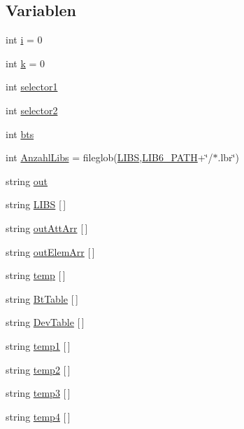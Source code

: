 \subsection*{Variablen}
\begin{DoxyCompactItemize}
\item 
int \hyperlink{test_8ulp_acb559820d9ca11295b4500f179ef6392}{i} = 0
\item 
int \hyperlink{test_8ulp_ab66ed8e0098c0a86b458672a55a9cca9}{k} = 0
\item 
int \hyperlink{test_8ulp_a2f0524c519c9a079ebbe76797552cfff}{selector1}
\item 
int \hyperlink{test_8ulp_acb22ea06df7a98062b750ecca56f1628}{selector2}
\item 
int \hyperlink{test_8ulp_a00c6cb851706bdde7570b25efe80733a}{bts}
\item 
int \hyperlink{test_8ulp_ae8b208e90c3b4ab20d7c823612b1a0f7}{Anzahl\+Libs} = fileglob(\hyperlink{test_8ulp_ab79ee21fe4aae7937f99de5b9c7b7d2c}{L\+I\+B\+S},\hyperlink{test_8ulp_a44dc1eefd5382033cf032f578a0130b9}{L\+I\+B6\+\_\+\+P\+A\+T\+H}+\char`\"{}/$\ast$.lbr\char`\"{})
\item 
string \hyperlink{test_8ulp_a43b9274914173cbec050c89b07f1824b}{out}
\item 
string \hyperlink{test_8ulp_ab79ee21fe4aae7937f99de5b9c7b7d2c}{L\+I\+B\+S} \mbox{[}$\,$\mbox{]}
\item 
string \hyperlink{test_8ulp_a801e8dfc827f7961b6012c0100f77ab4}{out\+Att\+Arr} \mbox{[}$\,$\mbox{]}
\item 
string \hyperlink{test_8ulp_abd552ace971c34ee4d05fc524378dc32}{out\+Elem\+Arr} \mbox{[}$\,$\mbox{]}
\item 
string \hyperlink{test_8ulp_a2f8d954bdd72eba003a9802a6248de83}{temp} \mbox{[}$\,$\mbox{]}
\item 
string \hyperlink{test_8ulp_af0d191df3e333660839f50e87bc098c8}{Bt\+Table} \mbox{[}$\,$\mbox{]}
\item 
string \hyperlink{test_8ulp_a44f73a7606acf532b5a5c0eb0aef6fbc}{Dev\+Table} \mbox{[}$\,$\mbox{]}
\item 
string \hyperlink{test_8ulp_a1739e013da948312edaaa3ade1bd7f7a}{temp1} \mbox{[}$\,$\mbox{]}
\item 
string \hyperlink{test_8ulp_a93cd3f3f743b20e134149e06efa22a88}{temp2} \mbox{[}$\,$\mbox{]}
\item 
string \hyperlink{test_8ulp_a6d07a7b1d2f2bb3e3061eba3b676dd44}{temp3} \mbox{[}$\,$\mbox{]}
\item 
string \hyperlink{test_8ulp_ad6a0fc9c82629f46ca764b920e57db24}{temp4} \mbox{[}$\,$\mbox{]}

\end{DoxyCompactItemize}
